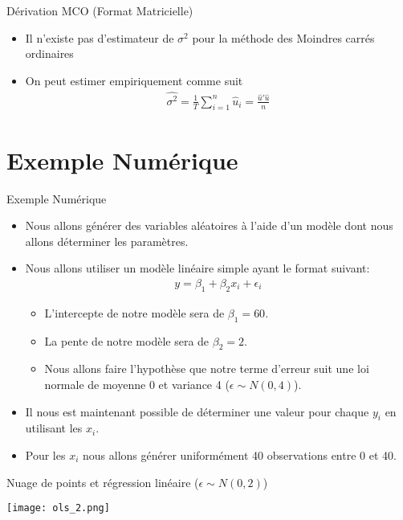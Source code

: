 \documentclass{beamer}
\begin{document}
\begin{frame}{Dérivation MCO (Format Matricielle)}
\begin{itemize}
\item Il n'existe pas d'estimateur de $\sigma^2$ pour la méthode des Moindres carrés ordinaires 
\item On peut estimer empiriquement comme suit
\begin{align*}
\hat{\sigma^2}= \frac{1}{T}\sum_{i=1}^n \hat{u}_i=\frac{\hat{u}'\hat{u}}{n}
\end{align*}
\end{itemize}
\end{frame}

\section{Exemple Numérique}

\frame{\tableofcontents[current]}

\begin{frame}{Exemple Numérique}
\begin{itemize}
\item Nous allons générer des variables aléatoires à l’aide d’un modèle dont nous allons déterminer les paramètres.
\item Nous allons utiliser un modèle linéaire simple ayant le format suivant:
\begin{align*}
y=\beta_1+\beta_2 x_i + \epsilon_i
\end{align*}
\begin{itemize}
\item L'intercepte de notre modèle sera de $\beta_1 = 60$.
\item La pente de notre modèle sera de $\beta_2=2$.
\item Nous allons faire l'hypothèse que notre terme d'erreur suit une loi normale de moyenne 0 et variance 4 ($\epsilon \sim N(0,4)$).
\end{itemize}
\item Il nous est maintenant possible de déterminer une valeur pour chaque $y_i$ en utilisant les $x_i$.
\item Pour les $x_i$ nous allons générer uniformément 40 observations entre 0 et 40. 
\end{itemize}
\end{frame}

\begin{frame}{Nuage de points et régression linéaire ($\epsilon \sim N(0,2)$)}

\texttt{[image: ols\_2.png]}
\end{frame}
\end{document}

